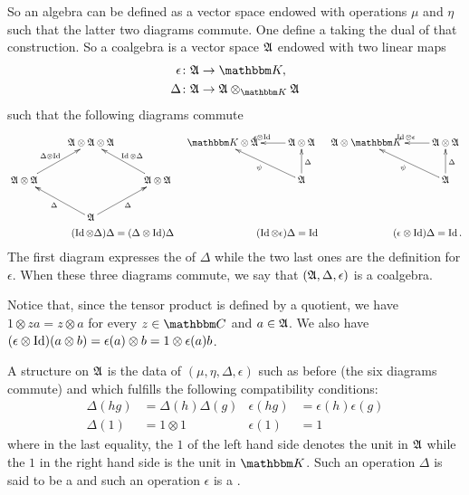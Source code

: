 So an algebra can be defined as a vector space endowed with operations $\mu$ and $\eta$ such that the latter two diagrams commute. One define a  taking the dual of that construction. So a coalgebra is a vector space $\mathfrak{A}$ endowed with two linear maps
\begin{align*}
\epsilon&\colon \cA\to \eK,\\
\Delta&\colon \cA\to \cA\otimes_{\eK}\cA
\end{align*}
such that the following diagrams commute
\begin{align}	\label{EsDigcococo}
\xymatrix{%
&	 					\cA\otimes\cA\otimes\cA\\
\cA\otimes\cA \ar[ur]^{\Delta\otimes\id}&					&	\cA\otimes\cA\ar[ul]_{\id\otimes\Delta}\\
&						\cA\ar[ul]^{\Delta}\ar[ur]_{\Delta}
}
&&	%
\xymatrix{%
\eK\otimes\cA 		&	\cA\otimes\cA\ar[l]_{\epsilon\otimes\id}\\
&	\cA\ar[ul]^{\psi}\ar[u]_{\Delta}
   }
&&	%
\xymatrix{%
\cA\otimes\eK 		&	\cA\otimes\cA\ar[l]_{\id\otimes\epsilon}\\
&	\cA\ar[ul]^{\psi}\ar[u]_{\Delta}
   }\\
   (\id\otimes\Delta)\Delta=(\Delta\otimes \id)\Delta   &&   (\id\otimes\epsilon)\Delta=\id&&(\epsilon\otimes\id)\Delta=\id.
\end{align}
The first diagram expresses the  of $\Delta$ while the two last ones are the  definition for $\epsilon$. When these three diagrams commute, we say that $(\mathfrak{A},\Delta,\epsilon)$ is a coalgebra.


Notice that, since the tensor product is defined by a quotient, we have $1\otimes za=z\otimes a$ for every $z\in\eC$ and $a\in\mathfrak{A}$. We also have $(\epsilon\otimes\operatorname{Id})(a\otimes b)=\epsilon(a)\otimes b=1\otimes\epsilon(a)b$.

\begin{definition}      \label{DefBialgebra}
    A  structure on $\mathfrak{A}$ is the data of $(\mu,\eta,\Delta,\epsilon)$ such as before (the six diagrams commute) and which fulfills the following compatibility conditions:
    \begin{align}       \label{EqSixBialgebraformdef}
    \Delta(hg)&=\Delta(h)\Delta(g)&			\epsilon(hg)&=\epsilon(h)\epsilon(g)\\
    \Delta(1)&=1\otimes 1		&		\epsilon(1)&=1
    \end{align}
    where in the last equality, the $1$ of the left hand side denotes the unit in $\mathfrak{A}$ while the $1$ in the right hand side is the unit in $\eK$. Such an operation $\Delta$ is said to be a  and such an operation $\epsilon$ is a .
\end{definition}

